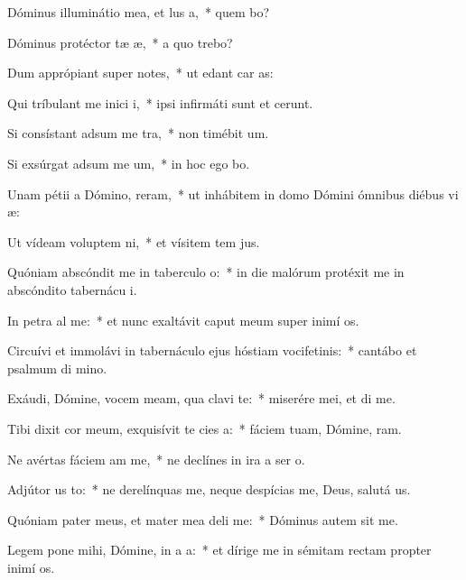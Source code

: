 \item Dóminus illuminátio mea, et lus a,~* quem bo?
\item Dóminus protéctor tæ æ,~* a quo trebo?
\item Dum apprópiant super  notes,~* ut edant car as:
\item Qui tríbulant me inici i,~* ipsi infirmáti sunt et cerunt.
\item Si consístant adsum me tra,~* non timébit  um.
\item Si exsúrgat adsum me um,~* in hoc ego bo.
\item Unam pétii a Dómino,  reram,~* ut inhábitem in domo Dómini ómnibus diébus vi æ:
\item Ut vídeam voluptem ni,~* et vísitem tem jus.
\item Quóniam abscóndit me in taberculo o:~* in die malórum protéxit me in abscóndito tabernácu i.
\item In petra al me:~* et nunc exaltávit caput meum super inimí os.
\item Circuívi et immolávi in tabernáculo ejus hóstiam vocifetinis:~* cantábo et psalmum di mino.
\item Exáudi, Dómine, vocem meam, qua clavi  te:~* miserére mei, et di me.
\item Tibi dixit cor meum, exquisívit te cies a:~* fáciem tuam, Dómine, ram.
\item Ne avértas fáciem am  me,~* ne declínes in ira a ser o.
\item Adjútor us to:~* ne derelínquas me, neque despícias me, Deus, salutá us.
\item Quóniam pater meus, et mater mea deli me:~* Dóminus autem sit me.
\item Legem pone mihi, Dómine, in a a:~* et dírige me in sémitam rectam propter inimí os.

